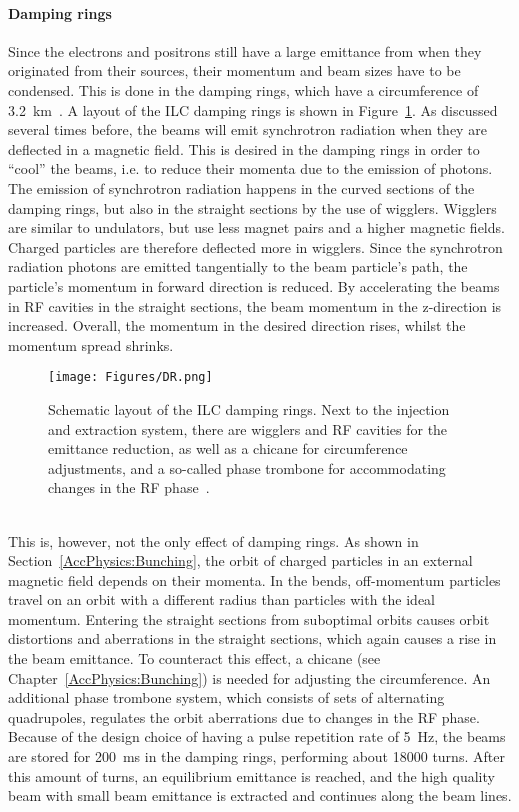 \paragraph{Damping rings}
Since the electrons and positrons still have a large emittance from when they originated from their sources, their momentum and beam sizes have to be condensed.
This is done in the damping rings, which have a circumference of \SI{3.2}{\kilo\meter}~\cite[p. 14]{TDR32}.
A layout of the ILC damping rings is shown in Figure~\ref{fig:DR}.
As discussed several times before, the beams will emit synchrotron radiation when they are deflected in a magnetic field.
This is desired in the damping rings in order to ``cool'' the beams, i.e. to reduce their momenta due to the emission of photons.
The emission of synchrotron radiation happens in the curved sections of the damping rings, but also in the straight sections by the use of wigglers.
Wigglers are similar to undulators, but use less magnet pairs and a higher magnetic fields.
Charged particles are therefore deflected more in wigglers.
Since the synchrotron radiation photons are emitted tangentially to the beam particle's path, the particle's momentum in forward direction is reduced.
By accelerating the beams in RF cavities in the straight sections, the beam momentum in the z-direction is increased.
Overall, the momentum in the desired direction rises, whilst the momentum spread shrinks.
\begin{figure}[h]
\centering
\texttt{[image: Figures/DR.png]}
\caption[Damping ring layout]{Schematic layout of the ILC damping rings.
Next to the injection and extraction system, there are wigglers and RF cavities for the emittance reduction, as well as a chicane for circumference adjustments, and a so-called phase trombone for accommodating changes in the RF phase~\cite[p. 15]{TDR32}.}
\label{fig:DR}
\end{figure}
\\This is, however, not the only effect of damping rings.
As shown in Section~\ref{AccPhysics:Bunching}, the orbit of charged particles in an external magnetic field depends on their momenta.
In the bends, off-momentum particles travel on an orbit with a different radius than particles with the ideal momentum.
Entering the straight sections from suboptimal orbits causes orbit distortions and aberrations in the straight sections, which again causes a rise in the beam emittance.
To counteract this effect, a chicane (see Chapter~\ref{AccPhysics:Bunching}) is needed for adjusting the circumference.
An additional phase trombone system, which consists of sets of alternating quadrupoles, regulates the orbit aberrations due to changes in the RF phase.
Because of the design choice of having a pulse repetition rate of \SI{5}{\hertz}, the beams are stored for \SI{200}{\milli\second} in the damping rings, performing about \num{18000} turns.
After this amount of turns, an equilibrium emittance is reached, and the high quality beam with small beam emittance is extracted and continues along the beam lines.

